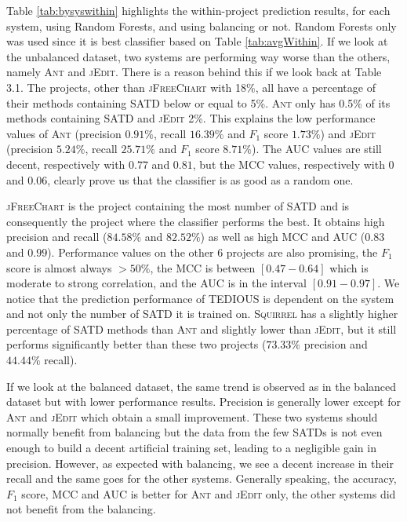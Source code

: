 Table \ref{tab:bysyswithin} highlights the within-project prediction results, for each system, using Random Forests, and using balancing or not. Random Forests only was used since it is best classifier based on Table \ref{tab:avgWithin}. If we look at the unbalanced dataset, two systems are performing way worse than the others, namely \textsc{Ant} and \textsc{jEdit}. There is a reason behind this if we look back at Table 3.1. The projects, other than \textsc{jFreeChart} with 18\%, all have a percentage of their methods containing SATD below or equal to 5\%. \textsc{Ant} only has 0.5\% of its methods containing SATD and \textsc{jEdit} 2\%. This explains the low performance values of \textsc{Ant} (precision $0.91\%$, recall $16.39\%$ and $F_1$ score $1.73\%$) and \textsc{jEdit} (precision $5.24\%$, recall $25.71\%$ and $F_1$ score $8.71\%$). The AUC values are still decent, respectively with $0.77$ and $0.81$, but the MCC values, respectively with $0$ and $0.06$, clearly prove us that the classifier is as good as a random one.

\textsc{jFreeChart} is the project containing the most number of SATD and is consequently the project where the classifier performs the best. It obtains high precision and recall ($84.58\%$ and  $82.52\%$) as well as high MCC and AUC ($0.83$ and $0.99$). Performance values on the other 6 projects are also promising, the $F_1$ score is almost always $>50\%$, the MCC is between $[0.47-0.64]$ which is moderate to strong correlation, and the AUC is in the interval $[0.91-0.97]$. We notice that the prediction performance of TEDIOUS is dependent on the system and not only the number of SATD it is trained on. \textsc{Squirrel} has a slightly higher percentage of SATD methods than \textsc{Ant} and slightly lower than \textsc{jEdit}, but it still performs significantly better than these two projects ($73.33\%$ precision and $44.44\%$ recall). 

If we look at the balanced dataset, the same trend is observed as in the balanced dataset but with lower performance results. Precision is generally lower except for \textsc{Ant} and \textsc{jEdit} which obtain a small improvement. These two systems should normally benefit from balancing but the data from the few SATDs is not even enough to build a decent artificial training set, leading to a negligible gain in precision. However, as expected with balancing, we see a decent increase in their recall and the same goes for the other systems. Generally speaking, the accuracy, $F_1$ score, MCC and AUC is better for \textsc{Ant} and \textsc{jEdit} only, the other systems did not benefit from the balancing.

